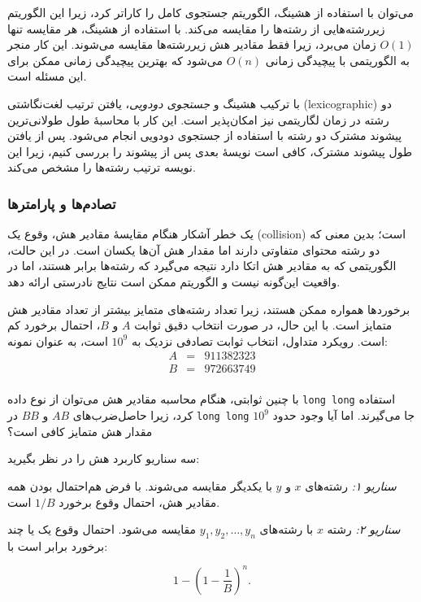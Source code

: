 می‌توان با استفاده از هشینگ، الگوریتم جستجوی کامل را کاراتر کرد، زیرا این الگوریتم زیررشته‌هایی از رشته‌ها را مقایسه می‌کند.
با استفاده از هشینگ، هر مقایسه تنها $O(1)$ زمان می‌برد،
زیرا فقط مقادیر هش زیررشته‌ها مقایسه می‌شوند.
این کار منجر به الگوریتمی با پیچیدگی زمانی $O(n)$ می‌شود
که بهترین پیچیدگی زمانی ممکن برای این مسئله است.

با ترکیب هشینگ و \emph{جستجوی دودویی}،
یافتن ترتیب لغت‌نگاشتی (lexicographic) دو رشته در زمان لگاریتمی نیز امکان‌پذیر است.
این کار با محاسبهٔ طول طولانی‌ترین پیشوند مشترک دو رشته با استفاده از جستجوی دودویی انجام می‌شود.
پس از یافتن طول پیشوند مشترک،
کافی است نویسهٔ بعدی پس از پیشوند را بررسی کنیم،
زیرا این نویسه ترتیب رشته‌ها را مشخص می‌کند.

\subsubsection*{تصادم‌ها و پارامترها}


یک خطر آشکار هنگام مقایسهٔ مقادیر هش،
وقوع یک  (collision) است؛ بدین معنی که دو رشته محتوای متفاوتی دارند اما مقدار هش آن‌ها یکسان است.
در این حالت، الگوریتمی که به مقادیر هش اتکا دارد نتیجه می‌گیرد که رشته‌ها برابر هستند،
اما در واقعیت این‌گونه نیست
و الگوریتم ممکن است نتایج نادرستی ارائه دهد.

برخوردها همواره ممکن هستند،
زیرا تعداد رشته‌های متمایز بیشتر از
تعداد مقادیر هش متمایز است.
با این حال، در صورت انتخاب دقیق ثوابت $A$ و $B$،
احتمال برخورد کم است.
رویکرد متداول، انتخاب ثوابت تصادفی
نزدیک به $10^9$ است، به عنوان نمونه:
\[
\begin{array}{lcl}
A & = & 911382323 \\
B & = & 972663749 \\
\end{array}
\]

با چنین ثوابتی،
هنگام محاسبه مقادیر هش می‌توان از نوع داده \texttt{long long} استفاده کرد،
زیرا حاصل‌ضرب‌های $AB$ و $BB$ در \texttt{long long} جا می‌گیرند.
اما آیا وجود حدود $10^9$ مقدار هش متمایز کافی است؟

سه سناریو کاربرد هش را در نظر بگیرید:

\textit{سناریو ۱:} رشته‌های $x$ و $y$ با یکدیگر
مقایسه می‌شوند.
با فرض هم‌احتمال بودن همه مقادیر هش،
احتمال وقوع برخورد $1/B$ است.

\textit{سناریو ۲:} رشته $x$ با رشته‌های
$y_1,y_2,\ldots,y_n$ مقایسه می‌شود.
احتمال وقوع یک یا چند برخورد برابر است با:

\[1-(1-\frac{1}{B})^n.\]

